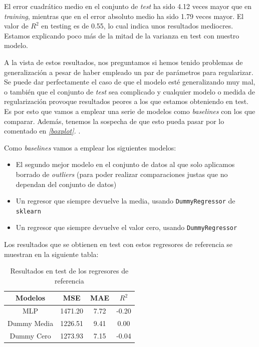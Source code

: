 \documentclass[11pt]{article}
\begin{document}
El error cuadrático medio en el conjunto de \emph{test} ha sido 4.12 veces mayor que en \emph{training}, mientras que en el error absoluto medio ha sido 1.79 veces mayor. El valor de $R^2$ en testing es de 0.55, lo cual indica unos resultados mediocres. Estamos explicando poco más de la mitad de la varianza en test con nuestro modelo.

A la vista de estos resultados, nos preguntamos si hemos tenido problemas de generalización a pesar de haber empleado un par de parámetros para regularizar. Se puede dar perfectamente el caso de que el modelo esté generalizando muy mal, o también que el conjunto de \emph{test} sea complicado y cualquier modelo o medida de regularización provoque resultados peores a los que estamos obteniendo en test. Es por esto que vamos a emplear una serie de modelos como \emph{baselines} con los que comparar. Además, tenemos la sospecha de que esto pueda pasar por lo comentado en \emph{\ref{boxplot}. }.

Como \emph{baselines} vamos a emplear los siguientes modelos:

\begin{itemize}
    \item El segundo mejor modelo en el conjunto de datos al que solo aplicamos borrado de \emph{outliers} (para poder realizar comparaciones justas que no dependan del conjunto de datos)
    \item Un regresor que siempre devuelve la media, usando \lstinline{DummyRegressor} de \lstinline{sklearn}
    \item Un regresor que siempre devuelve el valor cero, usando \lstinline{DummyRegressor}
\end{itemize}

Los resultados que se obtienen en test con estos regresores de referencia se muestran en la siguiente tabla:

\begin{table}[H]
  \centering
  \begin{tabular}{|c|c|c|c|}
  \hline
  \textbf{Modelos}  & \textbf{MSE} & \textbf{MAE} & \textbf{$R^2$} \\
  \hline
  MLP  & 1471.20  &  7.72 & -0.20 \\
  Dummy Media   & 1226.51 & 9.41 & 0.00 \\
  Dummy Cero & 1273.93 & 7.15 & -0.04 \\
  \hline
  \end{tabular}
  \caption{Resultados en test de los regresores de referencia}
\end{table}
\end{document}
